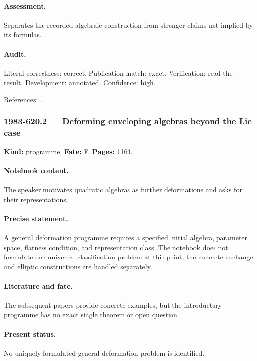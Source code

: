 \paragraph{Assessment.} Separates the recorded algebraic construction from stronger claims not implied by its formulas.

\paragraph{Audit.} Literal correctness: correct. Publication match: exact. Verification: read the result. Development: annotated. Confidence: high.

\noindent References: \citep{frenkel2007loop}.\par

\subsubsection{1983-620.2 --- Deforming enveloping algebras beyond the Lie case}

\label{item:1983-620.2}

\noindent\textbf{Kind:} programme. \textbf{Fate:} F. \textbf{Pages:} 1164.\par

\paragraph{Notebook content.} The speaker motivates quadratic algebras as further deformations and asks for their representations.

\paragraph{Precise statement.} A general deformation programme requires a specified initial algebra, parameter space, flatness condition, and representation class. The notebook does not formulate one universal classification problem at this point; the concrete exchange and elliptic constructions are handled separately.

\paragraph{Literature and fate.} The subsequent papers provide concrete examples, but the introductory programme has no exact single theorem or open question.

\paragraph{Present status.} No uniquely formulated general deformation problem is identified.

